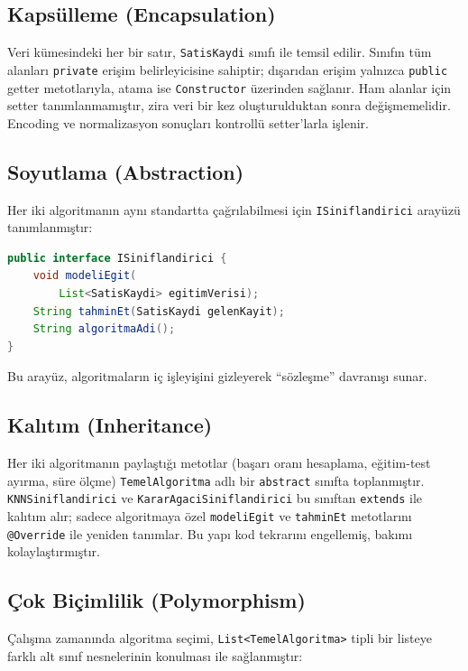 \documentclass[conference]{IEEEtran}
\begin{document}
\subsection{Kapsülleme (Encapsulation)}

Veri kümesindeki her bir satır, \texttt{SatisKaydi} sınıfı ile temsil edilir. Sınıfın tüm alanları \texttt{private} erişim belirleyicisine sahiptir; dışarıdan erişim yalnızca \texttt{public} getter metotlarıyla, atama ise \texttt{Constructor} üzerinden sağlanır. Ham alanlar için setter tanımlanmamıştır, zira veri bir kez oluşturulduktan sonra değişmemelidir. Encoding ve normalizasyon sonuçları kontrollü setter'larla işlenir.

\subsection{Soyutlama (Abstraction)}

Her iki algoritmanın aynı standartta çağrılabilmesi için \texttt{ISiniflandirici} arayüzü tanımlanmıştır:

\begin{lstlisting}[language=Java]
public interface ISiniflandirici {
    void modeliEgit(
        List<SatisKaydi> egitimVerisi);
    String tahminEt(SatisKaydi gelenKayit);
    String algoritmaAdi();
}
\end{lstlisting}

Bu arayüz, algoritmaların iç işleyişini gizleyerek ``sözleşme'' davranışı sunar.

\subsection{Kalıtım (Inheritance)}

Her iki algoritmanın paylaştığı metotlar (başarı oranı hesaplama, eğitim-test ayırma, süre ölçme) \texttt{TemelAlgoritma} adlı bir \texttt{abstract} sınıfta toplanmıştır. \texttt{KNNSiniflandirici} ve \texttt{KararAgaciSiniflandirici} bu sınıftan \texttt{extends} ile kalıtım alır; sadece algoritmaya özel \texttt{modeliEgit} ve \texttt{tahminEt} metotlarını \texttt{@Override} ile yeniden tanımlar. Bu yapı kod tekrarını engellemiş, bakımı kolaylaştırmıştır.

\subsection{Çok Biçimlilik (Polymorphism)}

Çalışma zamanında algoritma seçimi, \texttt{List<TemelAlgoritma>} tipli bir listeye farklı alt sınıf nesnelerinin konulması ile sağlanmıştır:
\end{document}
